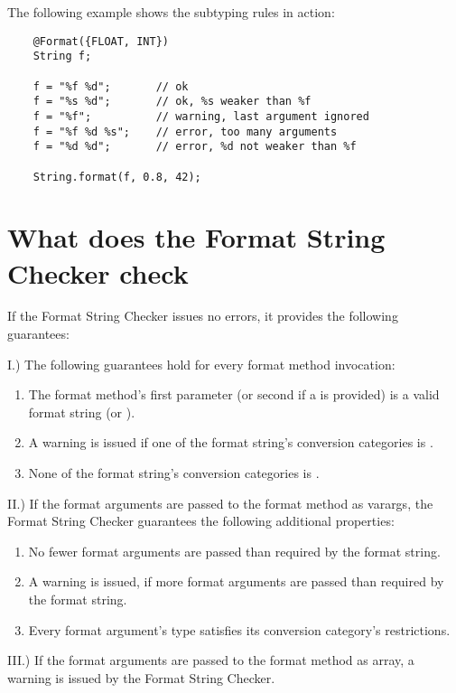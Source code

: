 The following example shows the subtyping rules in action:

\begin{Verbatim}
    @Format({FLOAT, INT}) 
    String f;

    f = "%f %d";       // ok
    f = "%s %d";       // ok, %s weaker than %f
    f = "%f";          // warning, last argument ignored
    f = "%f %d %s";    // error, too many arguments
    f = "%d %d";       // error, %d not weaker than %f

    String.format(f, 0.8, 42);
\end{Verbatim}

\section{What does the Format String Checker check\label{formatter-bugs}}

If the Format String Checker issues no errors, it provides the following guarantees:

\noindent I.) The following guarantees hold for every format method invocation:

\begin{enumerate} 
    \item The format method's first parameter (or second if a  is provided) is a valid 
        format string (or ).
    \item A warning is issued if one of the format string's conversion categories is .
    \item None of the format string's conversion categories is .
\end{enumerate} 

\noindent II.) If the format arguments are passed to the format method as varargs, the
Format String Checker guarantees the following additional properties:

\begin{enumerate} 
\item No fewer format arguments are passed than required by the format string.
\item A warning is issued, if more format arguments are passed than required by the format string.
\item Every format argument's type satisfies its conversion category's restrictions.
\end{enumerate}

\noindent III.) If the format arguments are passed to the format method as array, 
a warning is issued by the Format String Checker.

